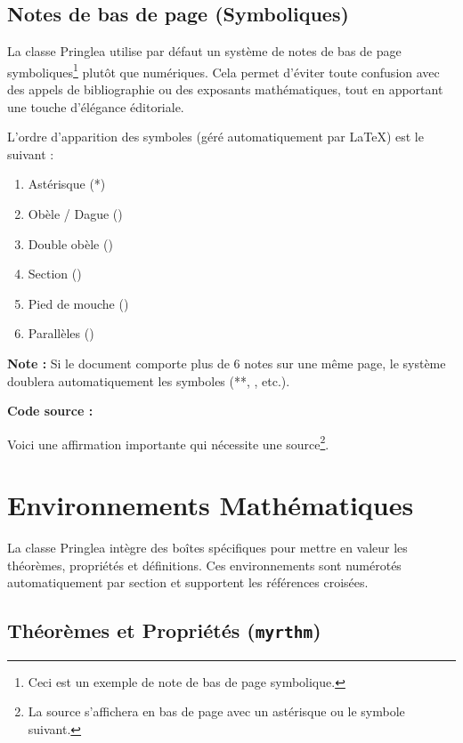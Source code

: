 \subsection{Notes de bas de page (Symboliques)}

La classe Pringlea utilise par défaut un système de notes de bas de page symboliques\footnote{Ceci est un exemple de note de bas de page symbolique.} plutôt que numériques. Cela permet d'éviter toute confusion avec des appels de bibliographie ou des exposants mathématiques, tout en apportant une touche d'élégance éditoriale.

L'ordre d'apparition des symboles (géré automatiquement par \LaTeX) est le suivant :

\begin{enumerate}
    \item Astérisque (*)
    \item Obèle / Dague (\textdagger)
    \item Double obèle (\textdaggerdbl)
    \item Section (\textsection)
    \item Pied de mouche (\textparagraph)
    \item Parallèles (\textbardbl)
\end{enumerate}

\textbf{Note :} Si le document comporte plus de 6 notes sur une même page, le système doublera automatiquement les symboles (**, \textdagger\textdagger, etc.).

\textbf{Code source :}
\begin{texblock}
Voici une affirmation importante qui nécessite une source\footnote{La source s'affichera en bas de page avec un astérisque ou le symbole suivant.}.
\end{texblock}

\section{Environnements Mathématiques}

La classe Pringlea intègre des boîtes spécifiques pour mettre en valeur les théorèmes, propriétés et définitions. Ces environnements sont numérotés automatiquement par section et supportent les références croisées.

\subsection{Théorèmes et Propriétés (\texttt{myrthm})}

